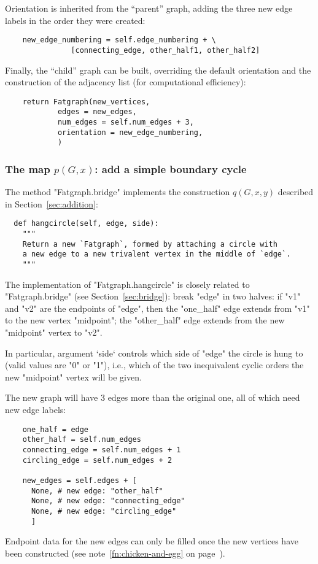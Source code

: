 Orientation is inherited from the ``parent'' graph, adding the three
new edge labels in the order they were created:
\begin{lstlisting}
    new_edge_numbering = self.edge_numbering + \
               [connecting_edge, other_half1, other_half2]

\end{lstlisting}
Finally, the ``child'' graph can be built, overriding the default
orientation and the construction of the adjacency list (for
computational efficiency):
\begin{lstlisting}
    return Fatgraph(new_vertices,
            edges = new_edges,
            num_edges = self.num_edges + 3,
            orientation = new_edge_numbering,
            )

\end{lstlisting}


\subsubsection{The map $p(G,x)$: add a simple boundary cycle}
\label{sec:hangcircle}

The method "Fatgraph.bridge" implements the construction $q(G,x,y)$
described in Section~\ref{sec:addition}:
\begin{lstlisting}
  def hangcircle(self, edge, side):
    """
    Return a new `Fatgraph`, formed by attaching a circle with
    a new edge to a new trivalent vertex in the middle of `edge`.
    """
\end{lstlisting}
The implementation of "Fatgraph.hangcircle" is closely related to
"Fatgraph.bridge" (see Section~\ref{sec:bridge}): break "edge" in two
halves: if "v1" and "v2" are the endpoints of "edge", then the
"one_half" edge extends from "v1" to the new vertex "midpoint"; the
"other_half" edge extends from the new "midpoint" vertex to "v2".

In particular, argument `side` controls which side of "edge" the
circle is hung to (valid values are "0" or "1"), i.e., which of the
two inequivalent cyclic orders the new "midpoint" vertex will be
given.

The new graph will have 3 edges more than the original one, all of
which need new edge labels:
\begin{lstlisting}
    one_half = edge
    other_half = self.num_edges
    connecting_edge = self.num_edges + 1
    circling_edge = self.num_edges + 2
    
    new_edges = self.edges + [
      None, # new edge: "other_half"
      None, # new edge: "connecting_edge"
      None, # new edge: "circling_edge"
      ]
\end{lstlisting}
Endpoint data for the new edges can only be filled once the new
vertices have been constructed (see note~\ref{fn:chicken-and-egg} on
page~\pageref{fn:chicken-and-egg}).%

